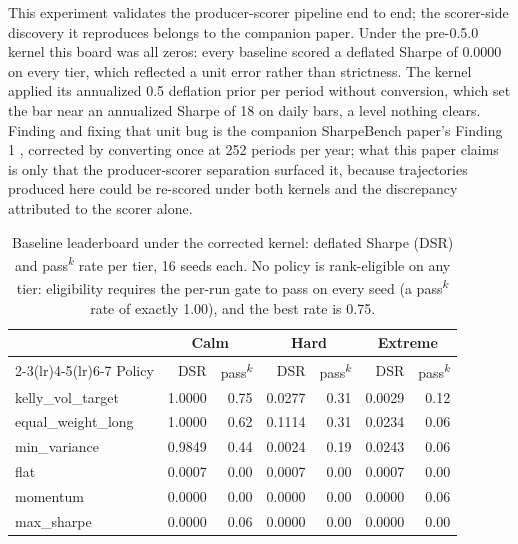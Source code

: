 This experiment validates the producer-scorer pipeline end to end; the scorer-side discovery it reproduces belongs to the companion paper. Under the pre-0.5.0 kernel this board was all zeros: every baseline scored a deflated Sharpe of 0.0000 on every tier, which reflected a unit error rather than strictness. The kernel applied its annualized 0.5 deflation prior per period without conversion, which set the bar near an annualized Sharpe of 18 on daily bars, a level nothing clears. Finding and fixing that unit bug is the companion SharpeBench paper's Finding 1 \citep{toca2026sharpebench}, corrected by converting once at 252 periods per year; what this paper claims is only that the producer-scorer separation surfaced it, because trajectories produced here could be re-scored under both kernels and the discrepancy attributed to the scorer alone.

\begin{table}[t]
\centering
\caption{Baseline leaderboard under the corrected kernel: deflated Sharpe (DSR) and pass\textsuperscript{$k$} rate per tier, 16 seeds each. No policy is rank-eligible on any tier: eligibility requires the per-run gate to pass on every seed (a pass\textsuperscript{$k$} rate of exactly 1.00), and the best rate is 0.75.}
\label{tab:f1}
\small
\setlength{\tabcolsep}{4.5pt}
\begin{tabular}{l rr rr rr}
\toprule
 & \multicolumn{2}{c}{Calm} & \multicolumn{2}{c}{Hard} & \multicolumn{2}{c}{Extreme} \\
\cmidrule(lr){2-3}\cmidrule(lr){4-5}\cmidrule(lr){6-7}
Policy & DSR & pass\textsuperscript{$k$} & DSR & pass\textsuperscript{$k$} & DSR & pass\textsuperscript{$k$} \\
\midrule
kelly\_vol\_target & 1.0000 & 0.75 & 0.0277 & 0.31 & 0.0029 & 0.12 \\
equal\_weight\_long & 1.0000 & 0.62 & 0.1114 & 0.31 & 0.0234 & 0.06 \\
min\_variance & 0.9849 & 0.44 & 0.0024 & 0.19 & 0.0243 & 0.06 \\
flat & 0.0007 & 0.00 & 0.0007 & 0.00 & 0.0007 & 0.00 \\
momentum & 0.0000 & 0.00 & 0.0000 & 0.00 & 0.0000 & 0.06 \\
max\_sharpe & 0.0000 & 0.06 & 0.0000 & 0.00 & 0.0000 & 0.00 \\
\bottomrule
\end{tabular}
\end{table}

